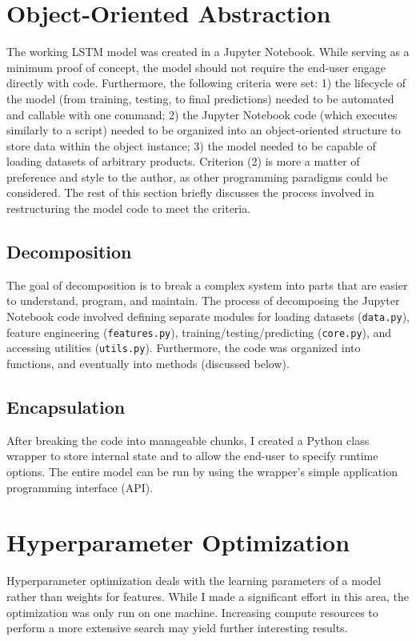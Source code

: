 \documentclass[11pt, oneside]{article}
\begin{document}
\section{Object-Oriented Abstraction}
The working LSTM model was created in a Jupyter Notebook. While serving as a minimum proof of concept, the model should not require the end-user engage directly with code. Furthermore, the following criteria were set: 1) the lifecycle of the model (from training, testing, to final predictions) needed to be automated and callable with one command; 2) the Jupyter Notebook code (which executes similarly to a script) needed to be organized into an object-oriented structure to store data within the object instance; 3) the model needed to be capable of loading datasets of arbitrary products. Criterion (2) is more a matter of preference and style to the author, as other programming paradigms could be considered. The rest of this section briefly discusses the process involved in restructuring the model code to meet the criteria.

\subsection{Decomposition}
The goal of decomposition is to break a complex system into parts that are easier to understand, program, and maintain. The process of decomposing the Jupyter Notebook code involved defining separate modules for loading datasets (\texttt{data.py}), feature engineering (\texttt{features.py}), training/testing/predicting (\texttt{core.py}), and accessing utilities (\texttt{utils.py}). Furthermore, the code was organized into functions, and eventually into methods (discussed below).

\subsection{Encapsulation}
After breaking the code into manageable chunks, I created a Python class wrapper to store internal state and to allow the end-user to specify runtime options. The entire model can be run by using the wrapper's simple application programming interface (API).

\section{Hyperparameter Optimization}
Hyperparameter optimization deals with the learning parameters of a model rather than weights for features. While I made a significant effort in this area, the optimization was only run on one machine. Increasing compute resources to perform a more extensive search may yield further interesting results.
\end{document}
